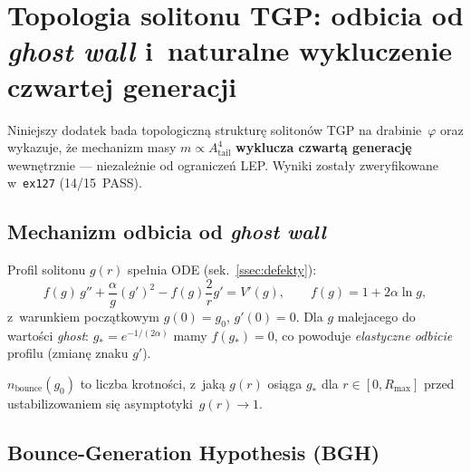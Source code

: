 \section{Topologia solitonu TGP: odbicia od \emph{ghost wall}
  i~naturalne wykluczenie czwartej genera\-cji}%
\label{app:T4-bounce}

Niniejszy dodatek bada topologiczn\k{a} struktur\k{e} soliton\'ow TGP
na drabinie~$\varphi$ oraz wykazuje, \.ze mechanizm masy $m \propto
A_{\mathrm{tail}}^4$ \textbf{wyklucza czwart\k{a} genera\-cj\k{e}}
wewn\k{e}trznie --- niezale\.znie od ogranicze\'n LEP.
Wyniki zosta\l{}y zweryfikowane w~\texttt{ex127} (14/15~PASS).

\subsection{Mechanizm odbicia od \emph{ghost wall}}
\label{app:T4-bounce-mechanism}

Profil solitonu $g(r)$ spe\l{}nia ODE (sek.~\ref{ssec:defekty}):
\[
  f(g)\,g'' + \frac{\alpha}{g}(g')^2 - f(g)\frac{2}{r}g' = V'(g),
  \qquad
  f(g) = 1 + 2\alpha\ln g,
\]
z~warunkiem pocz\k{a}tkowym $g(0) = g_0$, $g'(0)=0$.
Dla $g$ malejacego do warto\'sci \emph{ghost}: $g_* = e^{-1/(2\alpha)}$
mamy $f(g_*) = 0$, co powoduje \emph{elastyczne odbicie} profilu
(zmian\k{e} znaku $g'$).

\begin{definition}%
\label{def:T4-nbounce}
$n_{\mathrm{bounce}}(g_0)$ to liczba krotno\'sci,
z~jak\k{a} $g(r)$ osi\k{a}ga $g_*$ dla $r \in [0, R_{\max}]$
przed ustabilizowaniem si\k{e} asymptotyki~$g(r) \to 1$.
\end{definition}

\subsection{Bounce-Generation Hypothesis (BGH)}
\label{app:T4-bgh}

